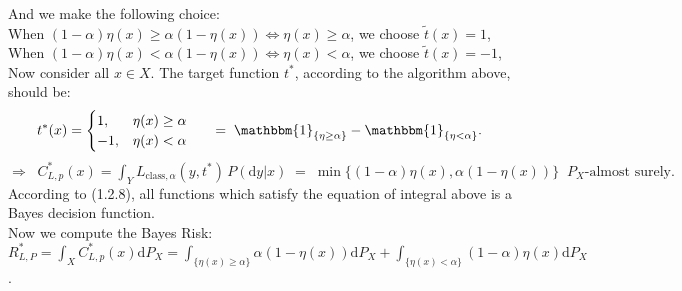 \documentclass{article}
\begin{document}
And we make the following choice:\\
When $(1-\alpha)\eta(x) \geq \alpha(1-\eta(x)) \Leftrightarrow \eta(x) \geq \alpha$, we choose $\tilde{t}(x) = 1$,\\
When $(1-\alpha)\eta(x) < \alpha(1-\eta(x)) \Leftrightarrow \eta(x) < \alpha$, we choose $\tilde{t}(x) = -1$,\\
Now consider all $x\in X$. The target function $t^*$, according to the algorithm above, should be:
\begin{align*}
t^*(x) = \begin{cases} 1, &\eta(x) \geq \alpha \cr -1, &\eta(x) < \alpha \end{cases} 
\indent = \; \mathbbm{1}_{\{\eta \geq \alpha\}} - \mathbbm{1}_{\{\eta < \alpha\}}.
\end{align*}
$\Rightarrow \;\; C^*_{L,p}(x) = \displaystyle{ \int_{Y}  L_{\text{class},\alpha}(y,t^*)\,  P(\text{d}y|x)} \;=\; \min \{ (1-\alpha)\eta(x), \alpha(1-\eta(x)) \}\;\; P_X\text{-almost surely}.$\\
According to (1.2.8), all functions which satisfy the equation of integral above is a Bayes decision function.\\
Now we compute the Bayes Risk:\\
$R^*_{L,P} =  \displaystyle{ \int_{X} C^*_{L,p}(x) \text{d}P_X = \int_{\{\eta(x)\geq \alpha\}}\alpha(1-\eta(x)) \text{d}P_X + \int_{\{\eta(x) < \alpha\}} (1-\alpha)\eta(x) \text{d}P_X } $.\\
 \\
\end{document}
